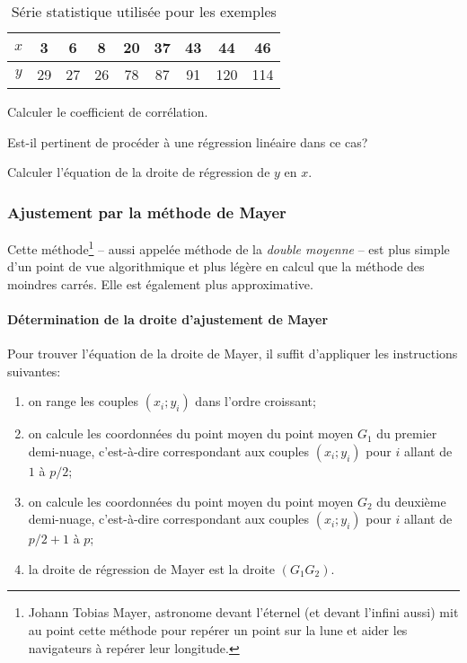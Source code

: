 \documentclass[a4paper,12pt]{scrartcl}
\begin{document}
\begin{table}[h]
    \centering
    \begin{tabular}{|c|c|c|c|c|c|c|c|c|}
        \hline
        $x$ & 3  & 6  & 8  & 20 & 37 & 43 & 44  & 46  \\ \hline
        $y$ & 29 & 27 & 26 & 78 & 87 & 91 & 120 & 114 \\ \hline
    \end{tabular}
    \caption{Série statistique utilisée pour les exemples}
    \label{tab:example}
\end{table}

Calculer le coefficient de corrélation. %


Est-il pertinent de procéder à une régression linéaire dans ce cas?


Calculer l'équation de la droite de régression de $y$ en $x$. %


\subsubsection{Ajustement par la méthode de Mayer}
Cette méthode\footnote{Johann Tobias Mayer, astronome devant l'éternel (et devant l'infini aussi) mit au point cette méthode pour repérer un point sur la lune et aider les navigateurs à repérer leur longitude.} -- aussi appelée méthode de la \emph{double moyenne} -- est plus simple d'un point de vue algorithmique et plus légère en calcul que la méthode des moindres carrés. Elle est également plus approximative. 

\paragraph{Détermination de la droite d'ajustement de Mayer}
Pour trouver l'équation de la droite de Mayer, il suffit d'appliquer les instructions suivantes:

\begin{enumerate}
    \item on range les couples $(x_i;y_i)$ dans l'ordre croissant;
    \item on calcule les coordonnées du point moyen du point moyen $G_1$ du premier \og{}demi-nuage\fg{}, c'est-à-dire correspondant aux couples $(x_i;y_i)$ pour $i$ allant de $1$ à $p/2$;
    \item on calcule les coordonnées du point moyen du point moyen $G_2$ du deuxième \og{}demi-nuage\fg{}, c'est-à-dire correspondant aux couples $(x_i;y_i)$ pour $i$ allant de $p/2+1$ à $p$;
    \item la droite de régression de Mayer est la droite $(G_1G_2)$.
\end{enumerate}
\end{document}

